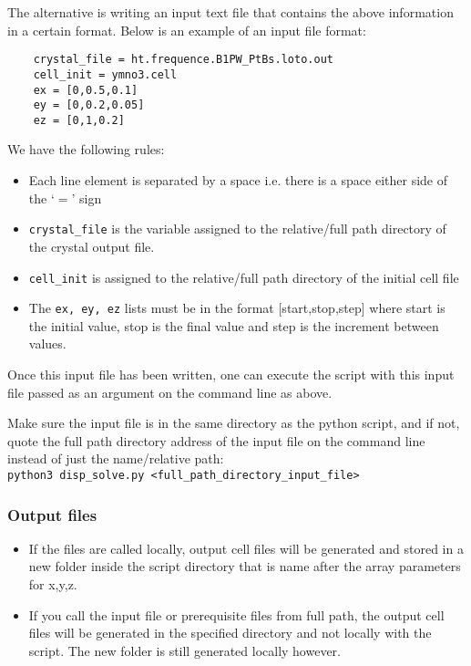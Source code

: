 The alternative is writing an input text file that contains the above information in a certain format. Below is an example of an input file format:

\begin{lstlisting}
	crystal_file = ht.frequence.B1PW_PtBs.loto.out
	cell_init = ymno3.cell
	ex = [0,0.5,0.1]
	ey = [0,0.2,0.05]
	ez = [0,1,0.2]
\end{lstlisting}

We have the following rules:

\begin{itemize}
	\item Each line element is separated by a space i.e. there is a space either side of the `$=$' sign
	\item \texttt{crystal\_file} is the variable assigned to the relative/full path directory of the crystal output file.
	\item \texttt{cell\_init} is assigned to the relative/full path directory of the initial cell file
	\item The \texttt{ex, ey, ez} lists must be in the format [start,stop,step] where start is the initial value, stop is the final value and step is the increment between values.
\end{itemize}

Once this input file has been written, one can execute the script with this input file passed as an argument on the command line as above.

Make sure the input file is in the same directory as the python script, and if not, quote the full path directory address of the input file on the command line instead of just the name/relative path:
\\
\texttt{python3 disp\_solve.py <full\_path\_directory\_input\_file>}
\\

\subsubsection{Output files}

\begin{itemize}
	\item If the files are called locally, output cell files will be generated and stored in a new folder inside the script directory that is name after the array parameters for x,y,z.
	\item If you call the input file or prerequisite files from full path, the output cell files will be generated in the specified directory and not locally with the script. The new folder is still generated locally however.
\end{itemize}

